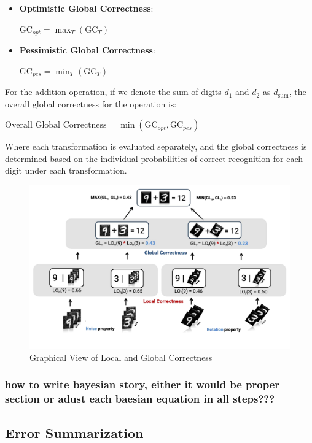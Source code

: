 \documentclass[10pt, conference, a4paper, final]{IEEEtran}
\begin{document}
    \begin{itemize}
        \item \textbf{Optimistic Global Correctness}:

        $\text{GC}_{opt} = \max_{T} (\text{GC}_{T})$
        \item \textbf{Pessimistic Global Correctness}:
    
        $\text{GC}_{pes} = \min_{T} (\text{GC}_{T})$

    \end{itemize}
    
    For the addition operation, if we denote the sum of digits $d_1$ and $d_2$ as $d_{\text{sum}}$, the overall global correctness for the operation is:
    
        $ \text{Overall Global Correctness} = \min(\text{GC}_{opt}, \text{GC}_{pes})$

    
    Where each transformation is evaluated separately, and the global correctness is determined based on the individual probabilities of correct recognition for each digit under each transformation.
    \begin{figure}{}
        \centering
        \includegraphics[width=\linewidth]{paper_images/noise_rotation_localcal_global.pdf}
        \caption{Graphical View of Local and Global Correctness}
        \label{fig:graph}
    \end{figure}

 
\subsubsection{how to write bayesian story, either it would be proper section or adust each baesian equation in all steps??? }
\subsection{Error Summarization}
\end{document}
